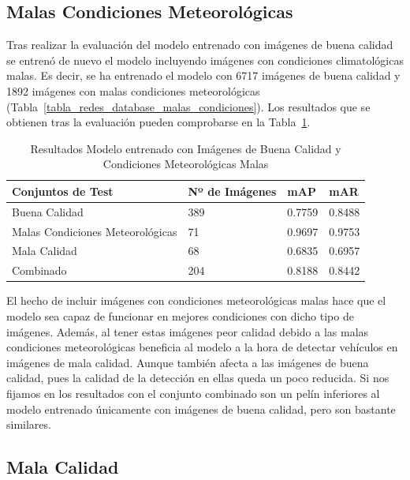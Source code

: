 \subsection{Malas Condiciones Meteorológicas}

Tras realizar la evaluación del modelo entrenado con imágenes de buena calidad se entrenó de nuevo el modelo incluyendo imágenes con condiciones climatológicas malas. Es decir, se ha entrenado el modelo con 6717 imágenes de buena calidad y 1892 imágenes con malas condiciones meteorológicas (Tabla~\ref{tabla_redes_database_malas_condiciones}). Los resultados que se obtienen tras la evaluación pueden comprobarse en la Tabla~\ref{resultados_test_buenas_malas_condiciones}.

\begin{table}[H] 
\begin{center}
\begin{tabular}{|l|l|l|l|}
\hline
 Conjuntos de Test & Nº de Imágenes & mAP & mAR  \\ 
\hline \hline
Buena Calidad & 389 & 0.7759 & 0.8488 \\ \hline
Malas Condiciones Meteorológicas & 71 & 0.9697 & 0.9753 \\ \hline
Mala Calidad  & 68 & 0.6835 & 0.6957\\ \hline
Combinado & 204 & 0.8188 & 0.8442\\ \hline
\end{tabular}
\caption{Resultados Modelo entrenado con Imágenes de Buena Calidad y Condiciones Meteorológicas Malas}
\label{resultados_test_buenas_malas_condiciones}
\end{center}
\end{table}

El hecho de incluir imágenes con condiciones meteorológicas malas hace que el modelo sea capaz de funcionar en mejores condiciones con dicho tipo de imágenes. Además, al tener estas imágenes peor calidad debido a las malas condiciones meteorológicas beneficia al modelo a la hora de detectar vehículos en imágenes de mala calidad. Aunque también afecta a las imágenes de buena calidad, pues la calidad de la detección en ellas queda un poco reducida. Si nos fijamos en los resultados con el conjunto combinado son un pelín inferiores al modelo entrenado únicamente con imágenes de buena calidad, pero son bastante similares.


\subsection{Mala Calidad}

